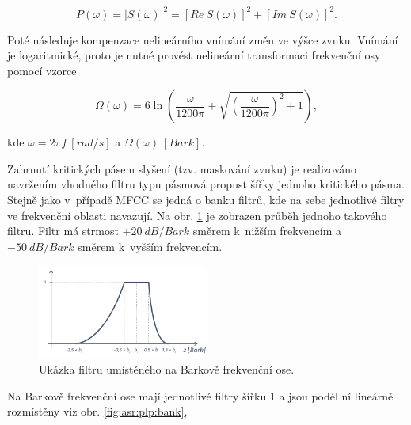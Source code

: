 \begin{equation}
  P\left(\omega\right) = \left| S\left(\omega\right) \right|^{2} = \left[Re\ S\left(\omega\right)\right]^2 + \left[Im\ S\left( \omega \right) \right]^2.
  \label{eq:asr:plp:spectr}
\end{equation}

\noindent Poté následuje kompenzace nelineárního vnímání změn ve výšce zvuku. Vnímání je logaritmické, proto je nutné provést nelineární transformaci frekvenční osy pomocí vzorce

\begin{equation}
  \Omega\left(\omega\right) = 6 \ln \left( \frac{\omega}{1200\pi} + \sqrt{\left(\frac{\omega}{1200\pi}\right)^2 + 1} \right),
  \label{eq:asr:plp:transform}
\end{equation}

\noindent kde $\omega = 2\pi f\ \left[rad/s\right]$ a $\Omega\left(\omega\right)\ \left[Bark\right]$.

Zahrnutí kritických pásem slyšení (tzv. maskování zvuku) je realizováno navržením vhodného filtru typu pásmová propust šířky jednoho kritického pásma. Stejně jako v~případě MFCC se jedná o banku filtrů, kde na sebe jednotlivé filtry ve frekvenční oblasti navazují.
Na obr. \ref{fig:asr:plp:filter} je zobrazen průběh jednoho takového filtru. Filtr má strmost $+20\ dB/Bark$ směrem  k~nižším frekvencím a $-50\ dB/Bark$ směrem  k~vyšším frekvencím.

\begin{figure}[hbpt]
  \centering
  \includegraphics[width=0.5\textwidth]{./ch4-asr/img/plp_filter.pdf}
  \caption{Ukázka filtru umístěného na Barkově frekvenční ose.}
  \label{fig:asr:plp:filter}
\end{figure}

\newpage \noindent Na Barkově frekvenční ose mají jednotlivé filtry šířku $1$ a jsou podél ní lineárně rozmístěny viz obr. \ref{fig:asr:plp:bank},

